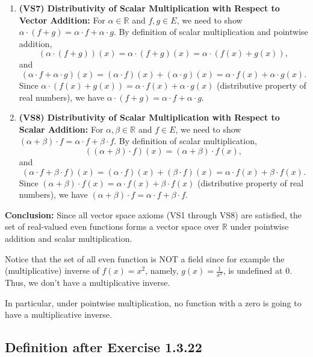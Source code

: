 \documentclass{article}
\theoremstyle{definition}
\begin{document}
\begin{enumerate}
    \item \textbf{(VS7) Distributivity of Scalar Multiplication with Respect to Vector Addition:} For \( \alpha \in \mathbb{R} \) and \( f, g \in E \), we need to show \( \alpha \cdot (f + g) = \alpha \cdot f + \alpha \cdot g \). By definition of scalar multiplication and pointwise addition,
    \[
    (\alpha \cdot (f + g))(x) = \alpha \cdot (f + g)(x) = \alpha \cdot (f(x) + g(x)),
    \]
    and
    \[
    (\alpha \cdot f + \alpha \cdot g)(x) = (\alpha \cdot f)(x) + (\alpha \cdot g)(x) = \alpha \cdot f(x) + \alpha \cdot g(x).
    \]
    Since \( \alpha \cdot (f(x) + g(x)) = \alpha \cdot f(x) + \alpha \cdot g(x) \) (distributive property of real numbers), we have \( \alpha \cdot (f + g) = \alpha \cdot f + \alpha \cdot g \).

    \item \textbf{(VS8) Distributivity of Scalar Multiplication with Respect to Scalar Addition:} For \( \alpha, \beta \in \mathbb{R} \) and \( f \in E \), we need to show \( (\alpha + \beta) \cdot f = \alpha \cdot f + \beta \cdot f \). By definition of scalar multiplication,
    \[
    ((\alpha + \beta) \cdot f)(x) = (\alpha + \beta) \cdot f(x),
    \]
    and
    \[
    (\alpha \cdot f + \beta \cdot f)(x) = (\alpha \cdot f)(x) + (\beta \cdot f)(x) = \alpha \cdot f(x) + \beta \cdot f(x).
    \]
    Since \( (\alpha + \beta) \cdot f(x) = \alpha \cdot f(x) + \beta \cdot f(x) \) (distributive property of real numbers), we have \( (\alpha + \beta) \cdot f = \alpha \cdot f + \beta \cdot f \).
\end{enumerate}

\textbf{Conclusion:} Since all vector space axioms (VS1 through VS8) are satisfied, the set of real-valued even functions forms a vector space over \( \mathbb{R} \) under pointwise addition and scalar multiplication.


Notice that the set of all even function is NOT a field since for example the (multiplicative) inverse of $f(x) = x^{2}$,
namely, $g(x) = \frac{1}{x^{2}}$, is undefined at $ 0 $. Thus, we don't have a multiplicative inverse.

In particular, under pointwise multiplication, no function with a zero is going to have a multiplicative inverse.

\newpage

\subsection{Definition after Exercise 1.3.22}
\end{document}
